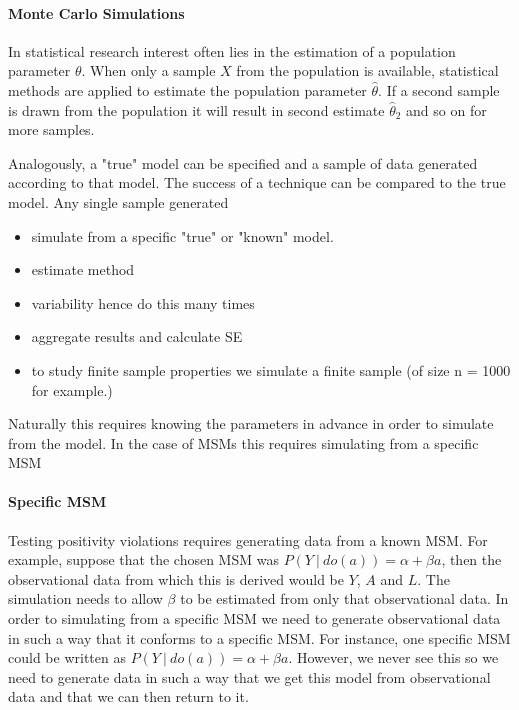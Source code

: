 \documentclass[11pt]{article}
\providecommand{\tightlist}{%
      \setlength{\itemsep}{0pt}\setlength{\parskip}{0pt}}
\begin{document}
\paragraph{Monte Carlo Simulations}\label{monte-carlo-simulations}

In statistical research interest often lies in the estimation of a
population parameter \(\theta\). When only a sample \(X\) from the
population is available, statistical methods are applied to estimate the
population parameter \(\hat \theta\). If a second sample is drawn from
the population it will result in second estimate \(\hat \theta_2\) and
so on for more samples.

Analogously, a "true" model can be specified and a sample of data
generated according to that model. The success of a technique can be
compared to the true model. Any single sample generated

\begin{itemize}
\tightlist
\item
  simulate from a specific "true" or "known" model.
\item
  estimate method
\item
  variability hence do this many times
\item
  aggregate results and calculate SE
\item
  to study finite sample properties we simulate a finite sample (of size
  n = 1000 for example.)
\end{itemize}

Naturally this requires knowing the parameters in advance in order to
simulate from the model. In the case of MSMs this requires simulating
from a specific MSM

\paragraph{Specific MSM}\label{specific-msm}

Testing positivity violations requires generating data from a known MSM.
For example, suppose that the chosen MSM was
\(P(Y\ |\ do(a)) = \alpha + \beta a\), then the observational data from
which this is derived would be \(Y\), \(A\) and \(L\). The simulation
needs to allow \(\beta\) to be estimated from only that observational
data. In order to simulating from a specific MSM we need to generate
observational data in such a way that it conforms to a specific MSM. For
instance, one specific MSM could be written as
\(P(Y\ |\ do(a)) = \alpha + \beta a\). However, we never see this so we
need to generate data in such a way that we get this model from
observational data and that we can then return to it.
\end{document}
